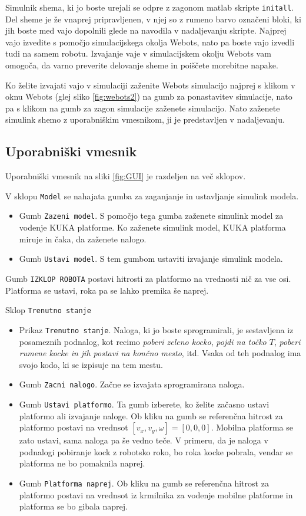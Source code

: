Simulnik shema, ki jo boste urejali se odpre z zagonom matlab skripte \verb|initall|. Del sheme je že vnaprej pripravljenen, v njej so z rumeno barvo označeni bloki, ki jih boste med vajo dopolnili glede na navodila v nadaljevanju skripte. Najprej vajo izvedite s pomočjo simulacijskega okolja Webots, nato pa boste vajo izvedli tudi na samem robotu. Izvajanje vaje v simulacijskem okolju Webots vam omogoča, da varno preverite delovanje sheme in poiščete morebitne napake.

Ko želite izvajati vajo v simulaciji zaženite Webots simulacijo najprej s klikom v oknu Webots (glej sliko \ref{fig:webots2}) na gumb za ponastavitev simulacije, nato pa s klikom na gumb za zagon simulacije zaženete simulacijo. Nato zaženete simulink shemo z uporabniškim vmesnikom, ji je predstavljen v nadaljevanju.

\subsection{Uporabniški vmesnik}

Uporabniški vmesnik na sliki \ref{fig:GUI} je razdeljen na več sklopov.

V sklopu \verb"Model" se nahajata gumba za zaganjanje in ustavljanje simulink  modela.
\begin{itemize}
\item Gumb \verb"Zazeni model". S pomočjo tega gumba zaženete simulink model za vodenje KUKA platforme. Ko zaženete simulink model, KUKA platforma miruje in čaka, da zaženete nalogo.
\item Gumb \verb"Ustavi model". S tem gumbom ustaviti izvajanje simulink modela.
\end{itemize}

Gumb \verb"IZKLOP ROBOTA" postavi hitrosti za platformo na vrednosti nič za vse osi. Platforma se ustavi, roka pa se lahko premika še naprej.

Sklop \verb"Trenutno stanje"
\begin{itemize}
\item Prikaz \verb"Trenutno stanje". Naloga, ki jo boste sprogramirali, je sestavljena iz posameznih podnalog, kot recimo \textit{poberi zeleno kocko}, \textit{pojdi na točko $T$}, \textit{poberi rumene kocke in jih postavi na končno mesto}, itd. Vsaka od teh podnalog ima svojo kodo, ki se izpisuje na tem mestu.
\item Gumb \verb"Zacni nalogo". Začne se izvajata sprogramirana naloga.
\item Gumb \verb"Ustavi platformo". Ta gumb izberete, ko želite začasno ustavi platformo ali izvajanje naloge. Ob kliku na gumb se referenčna hitrost za platformo postavi na vrednsot $[v_x,v_y,\omega]=[0,0,0]$. Mobilna platforma se zato ustavi, sama naloga pa še vedno teče. V primeru, da je naloga v podnalogi pobiranje kock z robotsko roko, bo roka kocke pobrala, vendar se platforma ne bo pomaknila naprej.
\item Gumb \verb"Platforma naprej". Ob kliku na gumb se referenčna hitrost za platformo postavi na vrednsot iz krmilnika za vodenje mobilne platforme in platforma se bo gibala naprej.
\end{itemize}


